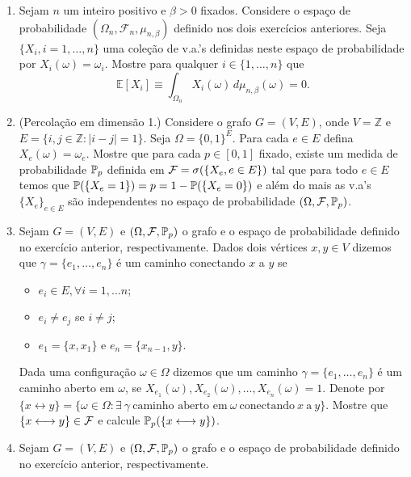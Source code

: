 \begin{enumerate}[leftmargin=*]
\item Sejam $n$ um inteiro positivo e $\beta>0$ fixados.
Considere o espaço de probabilidade 
$(\Omega_n,\mathcal{F}_n,\mu_{n,\beta})$
definido nos dois exercícios anteriores.
Seja $\{X_i,i=1,\ldots,n\}$ uma coleção 
de v.a.'s definidas neste espaço de probabilidade por 
$X_i(\omega)=\omega_i$.
Mostre para qualquer $i\in \{1,\ldots,n\}$ que
	\[
		\mathbb{E}[X_i] 
		\equiv
		\int_{\Omega_n} X_i(\omega)
		\, d\mu_{n,\beta}(\omega)
		=	 
		0.
	\]









\item (Percolação em dimensão 1.)
Considere o grafo $G=(V,E)$, 
onde $V=\mathbb{Z}$ e $E=\{ i,j\in\mathbb{Z}: |i-j|=1\}$.
Seja $\Omega=\{0,1\}^{E}$.
Para cada $e\in E$ defina $X_e(\omega)=\omega_e$.
Mostre que para cada $p\in [0,1]$ fixado, 
existe um medida de probabilidade 
$\P_p$ definida em $\F=\sigma(\{X_{e},e\in E\})$
tal que para todo $e\in E$ 
temos que $\P(\{X_e=1\})=p=1-\P(\{X_e=0\})$
e além do mais as v.a's $\{X_e\}_{e\in E}$ são independentes
no espaço de probabilidade $(\Omega,\F,\P_p)$.






\item
Sejam $G=(V,E)$ e  $(\Omega,\F,\P_p)$ o grafo e o espaço de probabilidade 
definido no exercício anterior, respectivamente.
Dados dois vértices $x,y\in V$ dizemos que 
$\gamma = \{e_1,\ldots,e_n\}$ é um caminho 
conectando $x$ a $y$ se 
\begin{itemize}
\item
$e_i\in E, \forall i=1,\ldots n$;
\item 
$e_i\neq e_j$ se $i\neq j$;
\item
$e_1=\{x,x_1\}$ e $e_n=\{x_{n-1},y\}$.
\end{itemize}
Dada uma configuração $\omega\in\Omega$
dizemos que um caminho $\gamma=\{e_1,\ldots,e_n\}$
é um caminho aberto em $\omega$, se 
$X_{e_1}(\omega),X_{e_2}(\omega),\ldots,X_{e_n}(\omega)=1$.
Denote por 
$
\{x \longleftrightarrow y\}
=
\{\omega\in\Omega: \exists\ \gamma\ \text{caminho aberto em}\ \omega\ 
\text{conectando}\ x \ \text{a}\ y\}.
$
Mostre que $\{x \longleftrightarrow y\}\in \F$ e
calcule $\P_p(\{x \longleftrightarrow y\})$.










\item
Sejam $G=(V,E)$ e  $(\Omega,\F,\P_p)$ o grafo e o espaço de probabilidade 
definido no exercício anterior, respectivamente.





\end{enumerate}